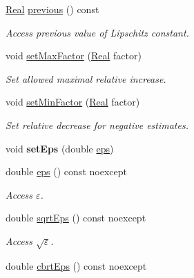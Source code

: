 \begin{DoxyCompactItemize}
\item 
\hyperlink{classSpacy_1_1Real}{Real} \hyperlink{classSpacy_1_1LipschitzConstant_a3a91ae4dea16ff7e83f1d51797145cbd}{previous} () const 
\begin{DoxyCompactList}\small\item\em Access previous value of Lipschitz constant. \end{DoxyCompactList}\item 
void \hyperlink{classSpacy_1_1LipschitzConstant_a5e4f00a4178814300de3f2a0ac391c1c}{set\+Max\+Factor} (\hyperlink{classSpacy_1_1Real}{Real} factor)
\begin{DoxyCompactList}\small\item\em Set allowed maximal relative increase. \end{DoxyCompactList}\item 
void \hyperlink{classSpacy_1_1LipschitzConstant_ac5dbb64f6535fe26b6f5e43c95d85282}{set\+Min\+Factor} (\hyperlink{classSpacy_1_1Real}{Real} factor)
\begin{DoxyCompactList}\small\item\em Set relative decrease for negative estimates. \end{DoxyCompactList}\item 
\hypertarget{classSpacy_1_1Mixin_1_1Eps_a1bbfd62541610d5d80f2782ab77158e4}{}void {\bfseries set\+Eps} (double \hyperlink{classSpacy_1_1Mixin_1_1Eps_a40e2ba8f3abd2b5370ef41238cfaaf8b}{eps})\label{classSpacy_1_1Mixin_1_1Eps_a1bbfd62541610d5d80f2782ab77158e4}

\item 
\hypertarget{classSpacy_1_1Mixin_1_1Eps_a40e2ba8f3abd2b5370ef41238cfaaf8b}{}double \hyperlink{classSpacy_1_1Mixin_1_1Eps_a40e2ba8f3abd2b5370ef41238cfaaf8b}{eps} () const noexcept\label{classSpacy_1_1Mixin_1_1Eps_a40e2ba8f3abd2b5370ef41238cfaaf8b}

\begin{DoxyCompactList}\small\item\em Access $\varepsilon$. \end{DoxyCompactList}\item 
\hypertarget{classSpacy_1_1Mixin_1_1Eps_a29e8c25dc3f1fdede57b8eb06f520fe1}{}double \hyperlink{classSpacy_1_1Mixin_1_1Eps_a29e8c25dc3f1fdede57b8eb06f520fe1}{sqrt\+Eps} () const noexcept\label{classSpacy_1_1Mixin_1_1Eps_a29e8c25dc3f1fdede57b8eb06f520fe1}

\begin{DoxyCompactList}\small\item\em Access $\sqrt\varepsilon$. \end{DoxyCompactList}\item 
\hypertarget{classSpacy_1_1Mixin_1_1Eps_a1879ebbf1b467cb4be36bcc63307018d}{}double \hyperlink{classSpacy_1_1Mixin_1_1Eps_a1879ebbf1b467cb4be36bcc63307018d}{cbrt\+Eps} () const noexcept\label{classSpacy_1_1Mixin_1_1Eps_a1879ebbf1b467cb4be36bcc63307018d}


\end{DoxyCompactItemize}
